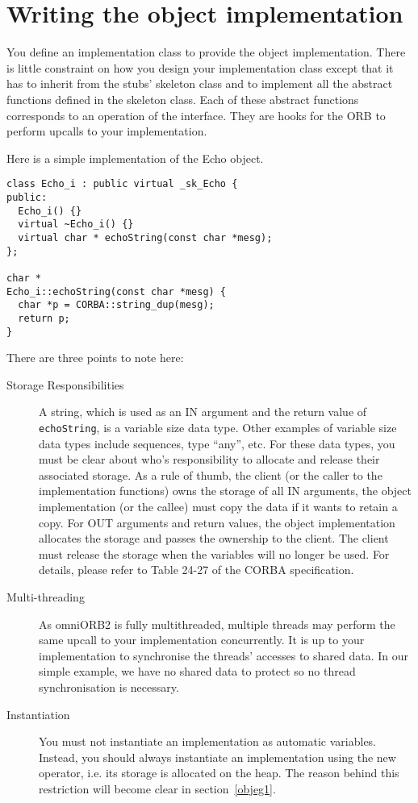 \documentclass[11pt,twoside,onecolumn]{book}
\begin{document}
\section{Writing the object implementation}
\label{objimpl}

You define an implementation class to provide the object
implementation. There is little constraint on how you design your
implementation class except that it has to inherit from the stubs' skeleton
class and to implement all the abstract functions defined in the skeleton
class. Each of these abstract functions corresponds to an operation of the
interface. They are hooks for the ORB to perform upcalls to your
implementation.

Here is a simple implementation of the Echo object.

{\small
\begin{verbatim}
class Echo_i : public virtual _sk_Echo {
public:
  Echo_i() {}
  virtual ~Echo_i() {}
  virtual char * echoString(const char *mesg);
};

char *
Echo_i::echoString(const char *mesg) {
  char *p = CORBA::string_dup(mesg);
  return p;
}
\end{verbatim}
}

There are three points to note here:
\begin{description}
\item[Storage Responsibilities] A string, which is used as an IN argument
and the return value of {\tt echoString}, is a variable size data
type. Other examples of variable size data types include sequences, type
``any'', etc. For these data types, you must be clear about who's
responsibility to allocate and release their associated storage. As a rule
of thumb, the client (or the caller to the implementation functions) owns
the storage of all IN arguments, the object implementation (or the callee)
must copy the data if it wants to retain a copy. For OUT arguments and
return values, the object implementation allocates the storage and passes
the ownership to the client. The client must release the storage when the
variables will no longer be used.  For details, please refer to Table 24-27
of the CORBA specification.

\item[Multi-threading] As omniORB2 is fully multithreaded, multiple threads
may perform the same upcall to your implementation concurrently. It is up
to your implementation to synchronise the threads' accesses to shared data.
In our simple example, we have no shared data to protect so no
thread synchronisation is necessary.

\item[Instantiation] You must not instantiate an implementation as
automatic variables. Instead, you should always instantiate an
implementation using the new operator, i.e. its storage is allocated on the
heap. The reason behind this restriction will become clear in
section~\ref{objeg1}.

\end{description}
\end{document}
